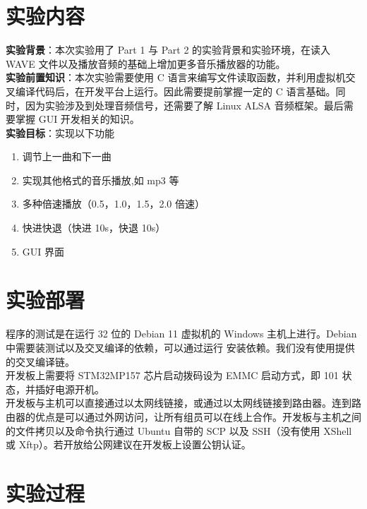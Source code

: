 \section{实验内容}

\textbf{实验背景}：本次实验用了 Part 1 与 Part 2 的实验背景和实验环境，在读入 WAVE 文件以及播放音频的基础上增加更多音乐播放器的功能。\\

\textbf{实验前置知识}：本次实验需要使用 C 语言来编写文件读取函数，并利用虚拟机交叉编译代码后，在开发平台上运行。因此需要提前掌握一定的 C 语言基础。同时，因为实验涉及到处理音频信号，还需要了解 Linux ALSA 音频框架。最后需要掌握 GUI 开发相关的知识。\\

\textbf{实验目标}：实现以下功能

\begin{enumerate}
    \item 调节上一曲和下一曲
    \item 实现其他格式的音乐播放,如 mp3 等
    \item 多种倍速播放（0.5，1.0，1.5，2.0 倍速）
    \item 快进快退（快进 10s，快退 10s）
    \item GUI 界面
\end{enumerate}

\section{实验部署}

程序的测试是在运行 32 位的 Debian 11 虚拟机的 Windows 主机上进行。Debian 中需要装测试以及交叉编译的依赖，可以通过运行  安装依赖。我们没有使用提供的交叉编译链。\\

开发板上需要将 STM32MP157 芯片启动拨码设为 EMMC 启动方式，即 101 状态，并插好电源开机。\\

开发板与主机可以直接通过以太网线链接，或通过以太网线链接到路由器。连到路由器的优点是可以通过外网访问，让所有组员可以在线上合作。开发板与主机之间的文件拷贝以及命令执行通过 Ubuntu 自带的 SCP 以及 SSH（没有使用 XShell 或 Xftp）。若开放给公网建议在开发板上设置公钥认证。

\newpage

\section{实验过程}


